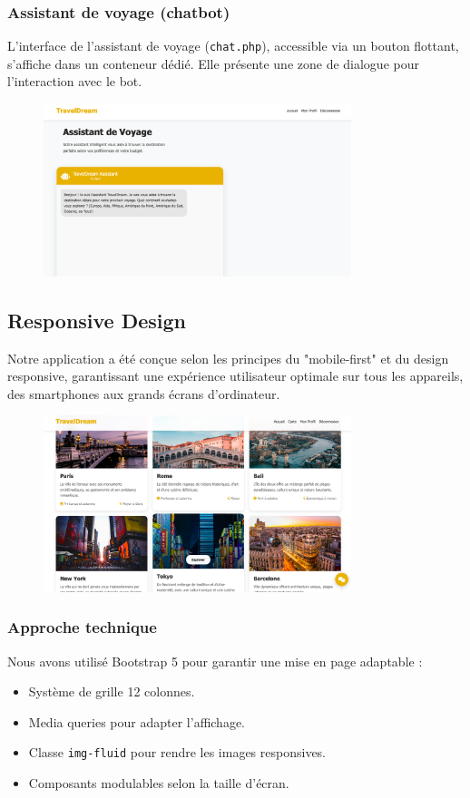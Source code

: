 \documentclass[a4paper,12pt]{article}
\begin{document}
\subsubsection{Assistant de voyage (chatbot)}
L'interface de l'assistant de voyage (\texttt{chat.php}), accessible via un bouton flottant, s'affiche dans un conteneur dédié. Elle présente une zone de dialogue pour l'interaction avec le bot.
\begin{figure}[H]
    \centering
    \includegraphics[width=0.8\textwidth]{chat.png}
\end{figure}
\subsection{Responsive Design}
Notre application a été conçue selon les principes du "mobile-first" et du design
responsive, garantissant une expérience utilisateur optimale sur tous les appareils, des
smartphones aux grands écrans d'ordinateur.
\begin{figure}[H]
    \centering
    \includegraphics[width=0.8\textwidth]{design.png}
\end{figure}

\subsubsection{Approche technique}
Nous avons utilisé Bootstrap 5 pour garantir une mise en page adaptable :
\begin{itemize}
  \item Système de grille 12 colonnes.
  \item Media queries pour adapter l’affichage.
  \item Classe \texttt{img-fluid} pour rendre les images responsives.
  \item Composants modulables selon la taille d’écran.
\end{itemize}
\end{document}
